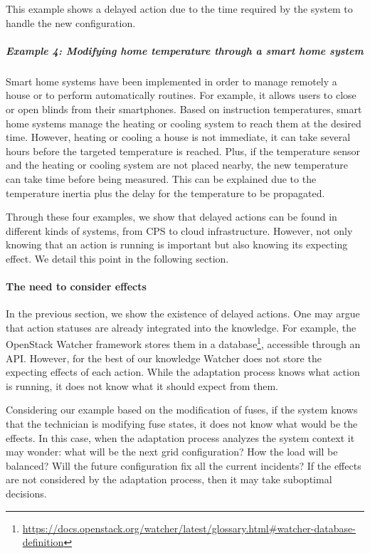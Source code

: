 This example shows a delayed action due to the time required by the system to handle the new configuration.

\subparagraph{Example 4: Modifying home temperature through a smart home system}
Smart home systems have been implemented in order to manage remotely a house or to perform automatically routines.
For example, it allows users to close or open blinds from their smartphones.
Based on instruction temperatures, smart home systems manage the heating or cooling system to reach them at the desired time.
However, heating or cooling a house is not immediate, it can take several hours before the targeted temperature is reached.
Plus, if the temperature sensor and the heating or cooling system are not placed nearby, the new temperature can take time before being measured.
This can be explained due to the temperature inertia plus the delay for the temperature to be propagated.

\bigskip

Through these four examples, we show that delayed actions can be found in different kinds of systems, from CPS to cloud infrastructure.
However, not only knowing that an action is running is important but also knowing its expecting effect.
We detail this point in the following section.

\paragraph{The need to consider effects}
In the previous section, we show the existence of delayed actions.
One may argue that action statuses are already integrated into the knowledge.
For example, the OpenStack Watcher framework stores them in a database\footnote{\url{https://docs.openstack.org/watcher/latest/glossary.html\#watcher-database-definition}}, accessible through an API.
However, for the best of our knowledge Watcher does not store the expecting effects of each action.
While the adaptation process knows what action is running, it does not know what it should expect from them.

Considering our example based on the modification of fuses, if the system knows that the technician is modifying fuse states, it does not know what would be the effects.
In this case, when the adaptation process analyzes the system context it may wonder: what will be the next grid configuration? How the load will be balanced? Will the future configuration fix all the current incidents?
If the effects are not considered by the adaptation process, then it may take suboptimal decisions.


